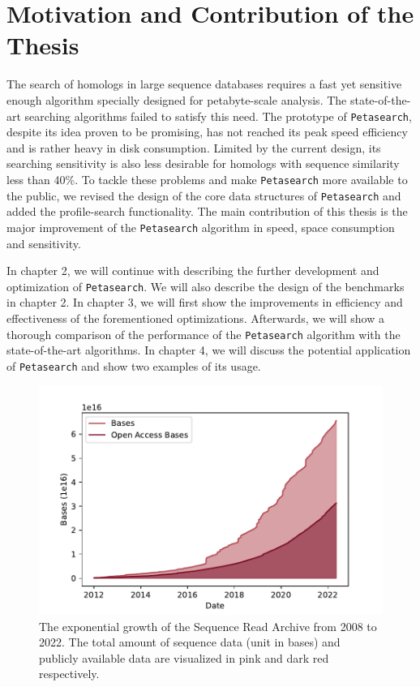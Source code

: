 \section{Motivation and Contribution of the Thesis}

The search of homologs in large sequence databases requires a fast yet sensitive enough algorithm specially designed for petabyte-scale analysis. The state-of-the-art searching algorithms failed to satisfy this need. The prototype of \texttt{Petasearch}, despite its idea proven to be promising, has not reached its peak speed efficiency and is rather heavy in disk consumption. Limited by the current design, its searching sensitivity is also less desirable for homologs with sequence similarity less than 40\%. To tackle these problems and make \texttt{Petasearch} more available to the public, we revised the design of the core data structures of \texttt{Petasearch} and added the profile-search functionality. The main contribution of this thesis is the major improvement of the \texttt{Petasearch} algorithm in speed, space consumption and sensitivity.

In chapter 2, we will continue with describing the further development and optimization of \texttt{Petasearch}. We will also describe the design of the benchmarks in chapter 2. In chapter 3, we will first show the improvements in efficiency and effectiveness of the forementioned optimizations. Afterwards, we will show a thorough comparison of the performance of the \texttt{Petasearch} algorithm with the state-of-the-art algorithms. In chapter 4, we will discuss the potential application of \texttt{Petasearch} and show two examples of its usage.

\pagebreak

\thispagestyle{empty}
\begin{figure}[t]
  \centering
  \includegraphics[width=\textwidth]{images/sra_stat.pdf}
  \caption{The exponential growth of the Sequence Read Archive from 2008 to 2022. The total amount of sequence data (unit in bases) and publicly available data are visualized in pink and dark red respectively.}
  \label{fig:sra_stat}
\end{figure}

